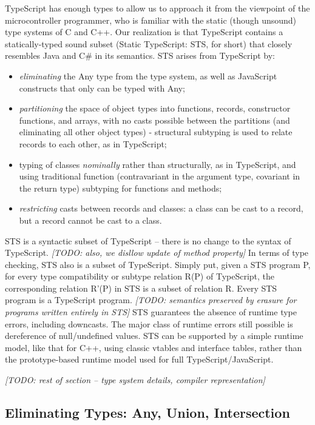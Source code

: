 TypeScript has enough types to allow us to approach it from the viewpoint of the microcontroller programmer, who is 
familiar with the static (though unsound) type systems of C and C++. Our realization is that TypeScript contains a
statically-typed sound subset (Static TypeScript: STS, for short) that closely resembles Java and C\# in its semantics.
STS arises from TypeScript by:
\begin{itemize}
\item \emph{eliminating} the Any type from the type system, as well as JavaScript constructs that only can be typed with Any;
\item \emph{partitioning} the space of object types into functions, records, constructor functions, and arrays, with no casts 
    possible between the partitions (and eliminating all other object types) - structural subtyping is used to relate records 
    to each other, as in TypeScript;
\item typing of classes \emph{nominally} rather than structurally, as in TypeScript, and using traditional function (contravariant 
    in the argument type, covariant in the return type) subtyping for functions and methods;
\item \emph{restricting} casts between records and classes: a class can be cast to a record, but a record cannot be cast to a class.
\end{itemize}
STS is a syntactic subset of TypeScript – there is no change to the syntax of TypeScript.
\emph{[TODO: also, we disllow update of method property]} 
In terms of type checking, STS also is a subset of TypeScript. Simply put, given a STS program P,
for every type compatibility or subtype relation R(P) of TypeScript, the corresponding relation R’(P) in STS
is a subset of relation R. Every STS program is a TypeScript program. 
\emph{[TODO: semantics preserved by erasure for programs written entirely in STS]}
STS guarantees the absence of runtime type errors, including downcasts.
The major class of runtime errors still possible is dereference of null/undefined values. 
STS can be supported by a simple runtime model, like that for C++, using classic vtables and interface tables,
rather than the prototype-based runtime model used for full TypeScript/JavaScript.

\emph{[TODO: rest of section – type system details, compiler representation]}

\subsection{Eliminating Types: Any, Union, Intersection}

